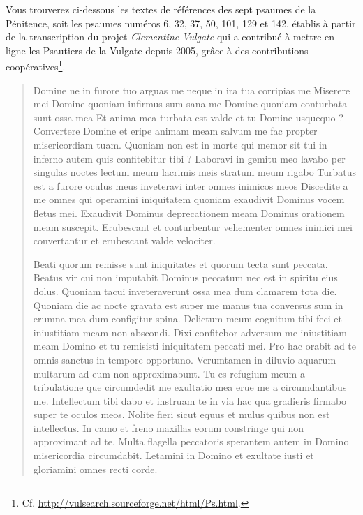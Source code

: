 \documentclass[a4paper,12pt,twoside]{book}
\begin{document}
	Vous trouverez ci-dessous les textes de références des sept psaumes de la Pénitence, soit les psaumes numéros 6, 32, 37, 50, 101, 129 et 142, établis à partir de la transcription du projet \og \textit{Clementine Vulgate}\fg{} qui a contribué à mettre en ligne les Psautiers de la Vulgate depuis 2005, grâce à des contributions coopératives\footnote{Cf. \url{http://vulsearch.sourceforge.net/html/Ps.html}.}.
	
	\begin{quotation}
	Domine ne in furore tuo arguas me neque in ira tua corripias me
Miserere mei Domine quoniam infirmus sum sana me Domine quoniam conturbata sunt ossa mea
Et anima mea turbata est valde et tu Domine usquequo ?
Convertere Domine et eripe animam meam salvum me fac propter misericordiam tuam. 
Quoniam non est in morte qui memor sit tui in inferno autem quis confitebitur tibi ? 
Laboravi in gemitu meo lavabo per singulas noctes lectum meum lacrimis meis stratum meum rigabo
Turbatus est a furore oculus meus inveteravi inter omnes inimicos meos
Discedite a me omnes qui operamini iniquitatem quoniam exaudivit Dominus vocem fletus mei.
Exaudivit Dominus deprecationem meam Dominus orationem meam suscepit. 
Erubescant et conturbentur vehementer omnes inimici mei convertantur et erubescant valde velociter.

Beati quorum remisse sunt iniquitates et quorum tecta sunt peccata.
Beatus vir cui non imputabit Dominus peccatum nec est in spiritu eius dolus.
Quoniam tacui inveteraverunt ossa mea dum clamarem tota die.
Quoniam die ac nocte gravata est super me manus tua conversus sum in erumna mea dum configitur spina.
Delictum meum cognitum tibi feci et iniustitiam meam non abscondi.
Dixi confitebor adversum me iniustitiam meam Domino et tu remisisti iniquitatem peccati mei.
Pro hac orabit ad te omnis sanctus in tempore opportuno.
Verumtamen in diluvio aquarum multarum ad eum non approximabunt.
Tu es refugium meum a tribulatione que circumdedit me exultatio mea erue me a circumdantibus me.
Intellectum tibi dabo et instruam te in via hac qua gradieris firmabo super te oculos meos.
Nolite fieri sicut equus et mulus quibus non est intellectus.
In camo et freno maxillas eorum constringe qui non approximant ad te.
Multa flagella peccatoris sperantem autem in Domino misericordia circumdabit.
Letamini in Domino et exultate iusti et gloriamini omnes recti corde.


\end{quotation}
\end{document}
